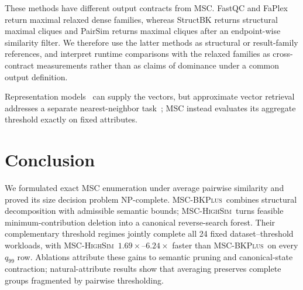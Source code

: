 \documentclass[sigconf, nonacm]{acmart}
\newcommand{\stitle}[1]{\vspace{0.7ex} \noindent{\bf #1}}
\newcommand{\subEnum}{MSC-\textsc{BKPlus}}
\newcommand{\monoSemMCE}{MSC-\textsc{HighSim}}
\begin{document}
These methods have different output contracts from MSC. FastQC and FaPlex
return maximal relaxed dense families, whereas StructBK returns structural
maximal cliques and PairSim returns maximal cliques after an endpoint-wise
similarity filter. We therefore use the latter methods as structural or
result-family references, and interpret runtime comparisons with the relaxed
families as cross-contract measurements rather than as claims of dominance
under a common output definition.

\stitle{Vector Attributes.}
Representation models~\cite{bordes2013,sun2019,perozzi2014deepwalk,kipf2017}
can supply the vectors, but approximate vector retrieval addresses a separate
nearest-neighbor task~\cite{andoni2006,malkov2020,johnson2021}; MSC instead
evaluates its aggregate threshold exactly on fixed attributes.
\section{Conclusion}
\label{sec:conclusion}
We formulated exact MSC enumeration under average pairwise similarity and
proved its size decision problem NP-complete. \subEnum\ combines structural
decomposition with admissible semantic bounds; \monoSemMCE\ turns feasible
minimum-contribution deletion into a canonical reverse-search forest. Their
complementary threshold regimes jointly complete all 24 fixed
dataset--threshold workloads, with \monoSemMCE\ $1.69\times$--$6.24\times$
faster than \subEnum\ on every $q_{99}$ row. Ablations attribute these gains to
semantic pruning and canonical-state contraction; natural-attribute results
show that averaging preserves complete groups fragmented by pairwise
thresholding.

\clearpage


\end{document}
